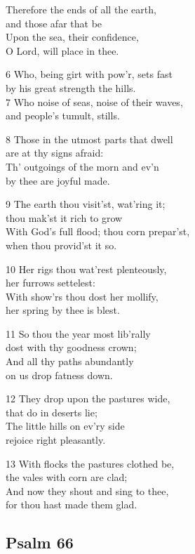 \begin{multicols}{3}
Therefore the ends of all the earth,\\
and those afar that be\\
Upon the sea, their confidence,\\
O Lord, will place in thee.

6 Who, being girt with pow’r, sets fast\\
by his great strength the hills.\\
7 Who noise of seas, noise of their waves,\\
and people’s tumult, stills.

8 Those in the utmost parts that dwell\\
are at thy signs afraid:\\
Th’ outgoings of the morn and ev’n\\
by thee are joyful made.

9 The earth thou visit’st, wat’ring it;\\
thou mak’st it rich to grow\\
With God’s full flood; thou corn prepar’st,\\
when thou provid’st it so.

10 Her rigs thou wat’rest plenteously,\\
her furrows settelest:\\
With show’rs thou dost her mollify,\\
her spring by thee is blest.

11 So thou the year most lib’rally\\
dost with thy goodness crown;\\
And all thy paths abundantly\\
on us drop fatness down.

12 They drop upon the pastures wide,\\
that do in deserts lie;\\
The little hills on ev’ry side\\
rejoice right pleasantly.

13 With flocks the pastures clothed be,\\
the vales with corn are clad;\\
And now they shout and sing to thee,\\
for thou hast made them glad.

\begin{center}
\quad{}\quad{}
\end{center}

\subsection*{Psalm 66}


\end{multicols}
